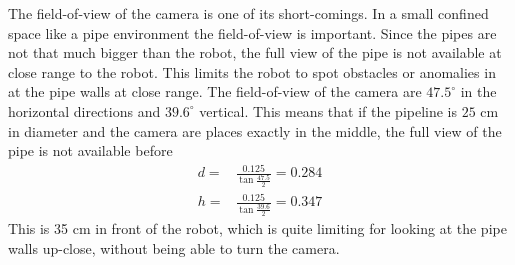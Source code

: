 The field-of-view of the camera is one of its short-comings. In a small confined space
like a pipe environment the field-of-view is important. Since the pipes are not that much
bigger than the robot, the full view of the pipe is not available at close range to the
robot. This limits the robot to spot obstacles or anomalies in at the pipe walls at close
range. The field-of-view of the camera are $47.5^\circ$ in the horizontal directions and
$39.6^\circ$ vertical. This means that if the pipeline is $25$ cm in diameter and the
camera are places exactly in the middle, the full view of the pipe is not available before
\begin{equation}
    \begin{aligned}
        d =& \frac{0.125}{ \tan \frac{47.5}{2}}  = 0.284\\
        h =& \frac{0.125}{\tan \frac{39.6}{2}} = 0.347
    \end{aligned}
\end{equation}
This is 35 cm in front of the robot, which is quite limiting for looking at the pipe walls
up-close, without being able to turn the camera. 




